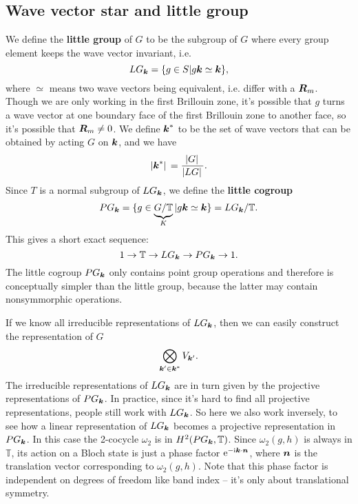 \documentclass[hyperref, a4paper]{article}
\newcommand*{\ii}{\mathrm{i}}
\newcommand*{\ee}{\mathrm{e}}
\newcommand*{\concept}[1]{{\textbf{#1}}}
\begin{document}
\subsection{Wave vector star and little group}

We define the \concept{little group} of $G$ to be the subgroup of $G$ where every group element keeps 
the wave vector invariant, i.e. 
\begin{equation}
    LG_{\vb*{k}} = \{g \in S | g \vb*{k} \simeq \vb*{k} \},
\end{equation}
where $\simeq$ means two wave vectors being equivalent, i.e. differ with a $\vb*{R}_m$.
Though we are only working in the first Brillouin zone, it's possible that $g$ turns a wave vector at one 
boundary face of the first Brillouin zone to another face, so it's possible that $\vb*{R}_m \neq 0$. 
We define $\vb*{k}^*$ to be the set of wave vectors that can be obtained by acting $G$ on $\vb*{k}$, and we have 
\begin{equation}
    \abs*{\vb*{k}^*} = \frac{\abs*{G}}{\abs*{LG}}.
\end{equation}
Since $T$ is a normal subgroup of $LG_{\vb*{k}}$, we define the \concept{little cogroup} 
\begin{equation}
    P G_{\vb*{k}} = \{ g \in \underbrace{ G / \mathbb{T}}_K | g \vb*{k} \simeq \vb*{k} \} = LG_{\vb*{k}} / \mathbb{T}.
\end{equation}
This gives a short exact sequence: 
\begin{equation}
    1 \to \mathbb{T} \to LG_{\vb*{k}} \to PG_{\vb*{k}} \to 1.
\end{equation}
The little cogroup $PG_{\vb*{k}}$ only contains point group operations and therefore is conceptually 
simpler than the little group, because the latter may contain nonsymmorphic operations. 

If we know all irreducible representations of $LG_{\vb*{k}}$, then we can easily construct the representation
of $G$ 
\begin{equation}
    \bigotimes_{\vb*{k}' \in \vb*{k}^*} V_{\vb*{k}'}.
\end{equation}
The irreducible representations of $LG_{\vb*{k}}$ are in turn given by the projective representations of $PG_{\vb*{k}}$.
In practice, since it's hard to find all projective representations, people still work with $LG_{\vb*{k}}$.
So here we also work inversely, to see how a linear representation of $LG_{\vb*{k}}$ becomes a 
projective representation in $PG_{\vb*{k}}$. In this case the 2-cocycle $\omega_2$ is in $H^2(PG_{\vb*{k}}, \mathbb{T})$.
Since $\omega_2(g, h)$ is always in $\mathbb{T}$, its action on a Bloch state is just a phase factor $\ee^{- \ii \vb*{k} \cdot \vb*{n}}$, where $\vb*{n}$ is the translation vector corresponding to $\omega_2(g, h)$.
Note that this phase factor is independent on degrees of freedom like band index -- it's only about translational symmetry.
\end{document}
